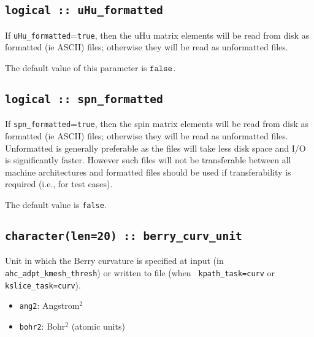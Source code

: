 \subsection[uHu\_formatted]{\tt logical :: uHu\_formatted}

If \verb#uHu_formatted#=\verb#true#, then the uHu matrix elements will be
read from disk as formatted (ie ASCII) files; otherwise they will be
read as unformatted files.

The default value of this parameter is $\verb#false#$.




\subsection[spn\_formatted]{\tt logical :: spn\_formatted}

If \verb#spn_formatted#=\verb#true#, then the spin matrix elements
will be read from disk as formatted (ie ASCII) files; otherwise they
will be read as unformatted files. Unformatted is generally preferable
as the files will take less disk space and I/O is significantly
faster. However such files will not be transferable between all
machine architectures and formatted files should be used if
transferability is required (i.e., for test cases).

The default value is \verb#false#.


\subsection[spn\_formatted]{\tt character(len=20) :: berry\_curv\_unit}

Unit in which the Berry curvature is specified at input (in {\tt
  ahc\_adpt\_kmesh\_thresh}) or written to file (when {\tt
  kpath\_task=curv} or {\tt kslice\_task=curv}).

\begin{itemize}

\item
  {\tt ang2}: Angstrom$^2$

\item
  {\tt bohr2}: Bohr$^2$ (atomic units)

\end{itemize}

